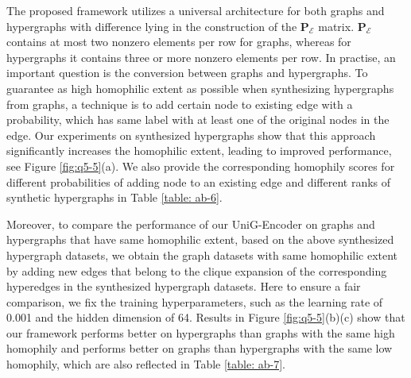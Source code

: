\documentclass[review]{elsarticle}
\begin{document}
The proposed framework utilizes a universal architecture for both graphs and hypergraphs with difference lying in the construction of the $\mathbf{P}_\mathcal{E}$ matrix. $\mathbf{P}_\mathcal{E}$ contains at most two nonzero elements per row for graphs, whereas for hypergraphs it contains three or more nonzero elements per row. In practise, an important question is the conversion between graphs and hypergraphs. To guarantee as high homophilic extent as possible when synthesizing hypergraphs from graphs, a technique is to add certain node to existing edge with a probability, which has same label with at least one of the original nodes in the edge. Our experiments on synthesized hypergraphs show that this approach significantly increases the homophilic extent, leading to improved performance, see Figure \ref{fig:q5-5}(a). We also provide the corresponding homophily scores for different probabilities of adding node to an existing edge and different ranks of synthetic hypergraphs in Table \ref{table: ab-6}.

\begin{table}[htbp]
  \centering
  \caption{\textbf{Corresponding homophily scores for different probabilities of adding node to an existing edge and different ranks of synthetic hypergraphs.}}
  \label{table: ab-6}
\end{table}

Moreover, to compare the performance of our UniG-Encoder on graphs and hypergraphs that have same homophilic extent, based on the above synthesized hypergraph datasets, we obtain the graph datasets with same homophilic extent by adding new edges that belong to the clique expansion of the corresponding hyperedges in the synthesized hypergraph datasets. Here to ensure a fair comparison, we fix the training hyperparameters, such as the learning rate of 0.001 and the hidden dimension of 64. Results in Figure \ref{fig:q5-5}(b)(c) show that our framework performs better on hypergraphs than graphs with the same high homophily and performs better on graphs than hypergraphs with the same low homophily, which are also reflected in Table \ref{table: ab-7}.
\end{document}
